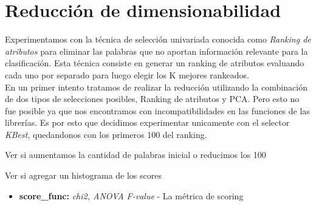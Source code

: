 \section{Reducción de dimensionabilidad}
Experimentamos con la técnica de selección univariada conocida como \textit{Ranking de atributos} para eliminar las palabras que no aportan información relevante
para la clasificación. Esta técnica consiste en generar un ranking de atributos evaluando cada uno por separado para luego elegir los K mejores rankeados. \\
En un primer intento tratamos de realizar la reducción utilizando la combinación de dos tipos de selecciones posibles, Ranking de atributos y PCA.
 Pero esto no fue posible ya que nos encontramos con incompatibilidades en las funciones de las librerías.
 Es por esto que decidimos experimentar unicamente con el selector \textit{KBest}, quedandonos con los primeros 100 del ranking.

{\Large Ver si aumentamos la cantidad de palabras inicial o reducimos los 100}

{\Large Ver si agregar un histograma de los scores}

\begin{itemize}
\item \textbf{score\_func:} \textit{chi2, ANOVA F-value} - La métrica de scoring
\end{itemize}
